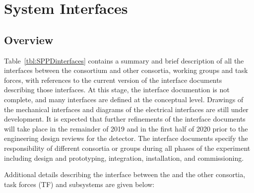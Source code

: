 \section{System Interfaces}
\label{sec:fdsp-pd-intfc}


\subsection{Overview}
Table~\ref{tbl:SPPDinterfaces} contains a summary and brief description of all the interfaces between the   consortium and other consortia, working groups and task forces, with references to the current version of the interface documents describing those interfaces.  At this stage, the interface documention is not complete, and many interfaces are defined at the conceptual level. Drawings of the mechanical interfaces and diagrams of the electrical interfaces are still under development. It is expected that further refinements of the interface documents will take place in the remainder of 2019 and in the first half of 2020 prior to the engineering design reviews for the detector. The interface documents specify the responsibility of different consortia or groups during all  phases of the experiment including design and prototyping, integration,  installation, and  commissioning.

Additional details describing the interface between the   and %
the other consortia, task forces (TF) and subsystems are given below:


